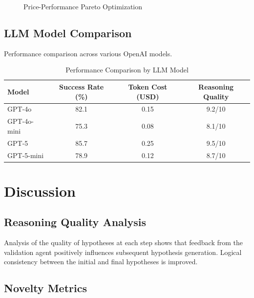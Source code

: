 \begin{figure}[H]
    \centering
    \caption{Price-Performance Pareto Optimization}
    \label{fig:pareto_optimization}
\end{figure}

\subsection{LLM Model Comparison}

Performance comparison across various OpenAI models.

\begin{table}[H]
    \centering
    \caption{Performance Comparison by LLM Model}
    \begin{tabular}{lccc}
    \toprule
         \textbf{Model} & \textbf{Success Rate (\%)} & \textbf{Token Cost (USD)} & \textbf{Reasoning Quality} \\
    \midrule
         GPT-4o & 82.1 & 0.15 & 9.2/10 \\
         GPT-4o-mini & 75.3 & 0.08 & 8.1/10 \\
         GPT-5 & 85.7 & 0.25 & 9.5/10 \\
         GPT-5-mini & 78.9 & 0.12 & 8.7/10 \\
    \bottomrule
    \end{tabular} 
    \label{tab:model_comparison}
\end{table}

\section{Discussion}

\subsection{Reasoning Quality Analysis}

Analysis of the quality of hypotheses at each step shows that feedback from the validation agent positively influences subsequent hypothesis generation. Logical consistency between the initial and final hypotheses is improved.

\subsection{Novelty Metrics}

